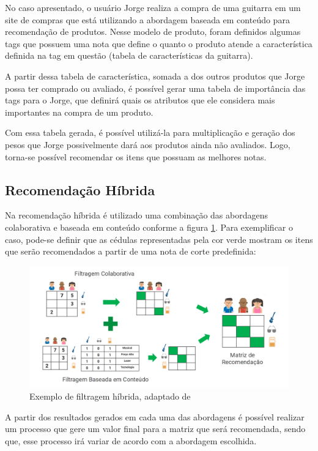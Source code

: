 No caso apresentado, o usuário Jorge realiza a compra de uma guitarra em um site de compras que está utilizando a abordagem baseada em conteúdo para recomendação de produtos. Nesse modelo de produto, foram definidos algumas tags que possuem uma nota que define o quanto o produto atende a característica definida na tag em questão (tabela de características da guitarra).

A partir dessa tabela de característica, somada a dos outros produtos que Jorge possa ter comprado ou avaliado, é possível gerar uma tabela de importância das tags para o Jorge, que definirá quais os atributos que ele considera mais importantes na compra de um produto.

Com essa tabela gerada, é possível utilizá-la para multiplicação e geração dos pesos que Jorge possivelmente dará aos produtos ainda não avaliados. Logo, torna-se possível recomendar os itens que possuam as melhores notas.

\subsection{Recomendação Híbrida}

Na recomendação híbrida é utilizado uma combinação das abordagens colaborativa e baseada em conteúdo conforme a figura \ref{fig:algoritmohibrido}. Para exemplificar o caso, pode-se definir que as cédulas representadas pela cor verde mostram os itens que serão recomendados a partir de uma nota de corte predefinida:

\begin{figure}[H]
	\centering
	\includegraphics[width=1\linewidth]{imagens/hibrida.png}
	\caption[Exemplo de filtragem híbrida]{Exemplo de filtragem híbrida, adaptado de \cite{araujo2011apprecommender}}
    \label{fig:algoritmohibrido}
\end{figure}

A partir dos resultados gerados em cada uma das abordagens é possível realizar um processo que gere um valor final para a matriz que será recomendada, sendo que, esse processo irá variar de acordo com a abordagem escolhida. 

